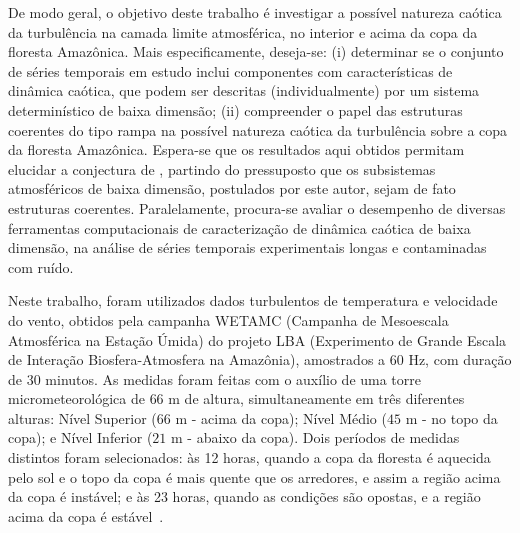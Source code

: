 De modo geral, o objetivo deste trabalho é investigar a possível natureza caótica da turbulência na camada limite atmosférica, no interior e acima da copa da floresta Amazônica. Mais especificamente, deseja-se: (i) determinar se o conjunto de séries temporais em estudo inclui componentes com características de dinâmica caótica, que podem ser descritas (individualmente) por um sistema determinístico de baixa dimensão; (ii) compreender o papel das estruturas coerentes do tipo rampa na possível natureza caótica da turbulência sobre a copa da floresta Amazônica. Espera-se que os resultados aqui obtidos permitam elucidar a conjectura de , partindo do pressuposto que os subsistemas atmosféricos de baixa dimensão, postulados por este autor, sejam de fato estruturas coerentes. Paralelamente, procura-se avaliar o desempenho de diversas ferramentas computacionais de caracterização de dinâmica caótica de baixa dimensão, na análise de séries temporais experimentais longas e contaminadas com ruído.

Neste trabalho, foram utilizados dados turbulentos de temperatura e velocidade do vento, obtidos pela campanha WETAMC (Campanha de Mesoescala Atmosférica na Estação Úmida) do projeto LBA (Experimento de Grande Escala de Interação Biosfera-Atmosfera na Amazônia), amostrados a $60$ Hz, com duração de $30$ minutos. As medidas foram feitas com o auxílio de uma torre micrometeorológica de $66$ m de altura, simultaneamente em três diferentes alturas: Nível Superior ($66$ m - acima da copa); Nível Médio ($45$ m -  no topo da copa); e Nível Inferior ($21$ m - abaixo da copa). Dois períodos de medidas distintos foram selecionados: às 12 horas, quando a copa da floresta é aquecida pelo sol e o topo da copa é mais quente que os arredores, e assim a região acima da copa é instável; e às 23 horas, quando as condições são opostas, e a região acima da copa é estável~\cite{Ramos/04}.

